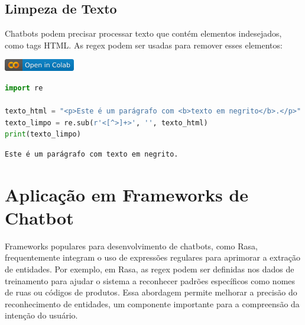 \documentclass[14pt,a4paper,oneside]{book}
\begin{document}
\subsection{Limpeza de Texto}
Chatbots podem precisar processar texto que contém elementos indesejados, como tags HTML. As regex podem ser usadas para remover esses elementos:

\vspace{\baselineskip}
\href{https://colab.research.google.com/github/giseldo/chatbotbook/blob/main/notebook/cap11_5.ipynb}{
  \includegraphics{./fig/colab-badge.png}
}

\begin{lstlisting}[language=Python, caption=Limpeza de texto removendo tags HTML, label=lst:limpeza_html]
import re

texto_html = "<p>Este é um parágrafo com <b>texto em negrito</b>.</p>"
texto_limpo = re.sub(r'<[^>]+>', '', texto_html)
print(texto_limpo)
\end{lstlisting}

\begin{lstlisting}
Este é um parágrafo com texto em negrito.
\end{lstlisting}


\section{Aplicação em Frameworks de Chatbot}

Frameworks populares para desenvolvimento de chatbots, como Rasa, frequentemente integram o uso de expressões regulares para aprimorar a extração de entidades. 
Por exemplo, em Rasa, as regex podem ser definidas nos dados de treinamento para ajudar o sistema a reconhecer padrões específicos como nomes de ruas ou códigos de produtos. 
Essa abordagem permite melhorar a precisão do reconhecimento de entidades, um componente importante para a compreensão da intenção do usuário.
\end{document}
